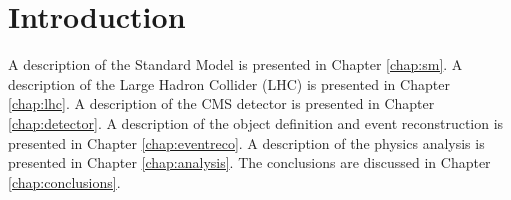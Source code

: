 \chapter{Introduction}

A description of the Standard Model is presented in Chapter \ref{chap:sm}. A description of the Large Hadron Collider (LHC) is presented in Chapter \ref{chap:lhc}. A description of the CMS detector is presented in Chapter \ref{chap:detector}. A description of the object definition and event reconstruction is presented in Chapter \ref{chap:eventreco}.  A description of the physics analysis is presented in Chapter \ref{chap:analysis}. The conclusions are discussed in Chapter \ref{chap:conclusions}.
